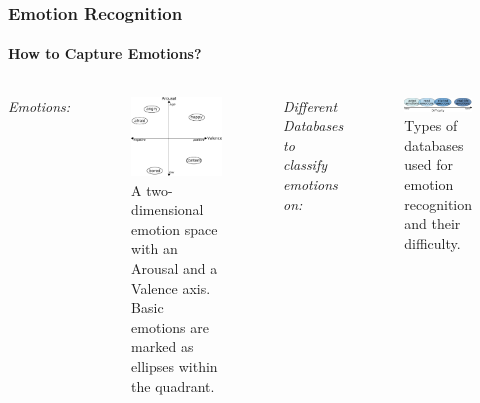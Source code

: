 \documentclass[10pt,usepdftitle=false,aspectratio=169]{beamer}
\begin{document}
\begin{frame}\frametitle{Emotion Recognition}
    \framesubtitle{How to Capture Emotions?}
    
\begin{columns}
	
    
\emph{Emotions:}
\begin{figure}
	\includegraphics[width=.7\textwidth]{figures/2DemotionMapping.pdf}	
	\caption{A two-dimensional emotion space with an Arousal and a Valence axis. Basic emotions are marked as ellipses within the quadrant. }

\end{figure}
   
\vspace{2em}
\vspace{1em}
	\emph{Different Databases to classify emotions on:}
	\vspace{1em}
	\begin{figure}
		\includegraphics[width=1.0\textwidth]{figures/differentDatabases.pdf}	
		\caption{Types of databases used for emotion recognition and their difficulty.}
	\end{figure}


	
	\end{columns}
\end{frame}
\end{document}
